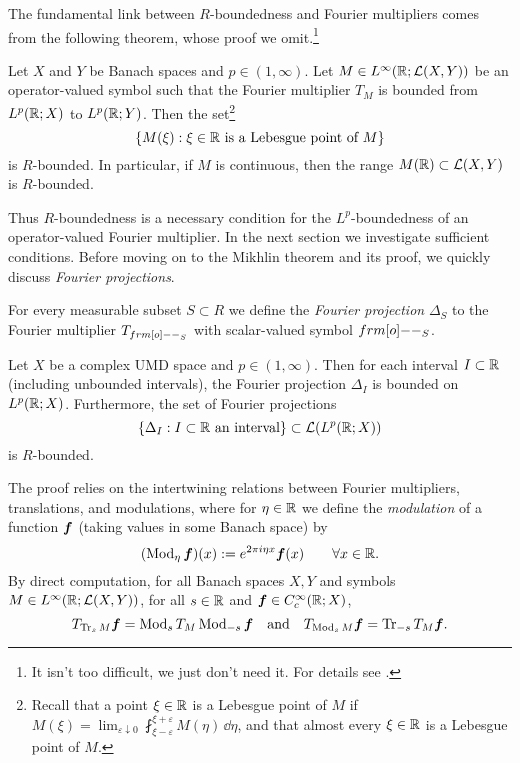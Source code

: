 The fundamental link between $R$-boundedness and Fourier multipliers comes from the following theorem, whose proof we omit.\footnote{It isn't too difficult, we just don't need it. For details see \cite[Theorem 5.3.15]{HNVW16}.}

\begin{thm}
  Let $X$ and $Y$ be Banach spaces and $p \in (1,\infty)$.
  Let $M \in L^\infty(\mathbb{R};\mathcal{L}(X,Y))$ be an operator-valued symbol such that the Fourier multiplier $T_{M}$ is bounded from $L^p(\mathbb{R};X)$ to $L^p(\mathbb{R};Y)$.
  Then the set\footnote{Recall that a point $\xi \in \mathbb{R}$ is a Lebesgue point of $M$ if $M(\xi) = \lim_{\varepsilon \downarrow 0} \fint_{\xi-\varepsilon}^{\xi+\varepsilon} M(\eta) \, \dd\eta $, and that almost every $\xi \in \mathbb{R}$ is a Lebesgue point of $M$.}
  \begin{equation*}
    \{M(\xi) : \text{$\xi \in \mathbb{R}$ is a Lebesgue point of $M$}\}
  \end{equation*}
  is $R$-bounded.
  In particular, if $M$ is continuous, then the range $M(\mathbb{R}) \subset \mathcal{L}(X,Y)$ is $R$-bounded.
\end{thm}

Thus $R$-boundedness is a necessary condition for the $L^p$-boundedness of an operator-valued Fourier multiplier.
In the next section we investigate sufficient conditions.
Before moving on to the Mikhlin theorem and its proof, we quickly discuss \emph{Fourier projections}.

\begin{defn}
  For every measurable subset $S \subset R$ we define the \emph{Fourier projection} $\Delta_{S}$ to the Fourier multiplier $T_{\1_{S}}$ with scalar-valued symbol $\1_{S}$.
\end{defn}

\begin{prop}\label{prop:Fproj-Rbd}
  Let $X$ be a complex UMD space and $p \in (1,\infty)$.
  Then for each interval $I \subset \mathbb{R}$ (including unbounded intervals), the Fourier projection $\Delta_{I}$ is bounded on $L^p(\mathbb{R};X)$.
  Furthermore, the set of Fourier projections
  \begin{equation*}
    \{\Delta_{I} : \text{$I \subset \mathbb{R}$ an interval} \} \subset \mathcal{L}(L^p(\mathbb{R};X))
  \end{equation*}
  is $R$-bounded.
\end{prop}

The proof relies on the intertwining relations between Fourier multipliers, translations, and modulations, where for $\eta \in \mathbb{R}$ we define the \emph{modulation} of a function $\bm{f}$ (taking values in some Banach space) by
\begin{equation*}
  (\operatorname{Mod}_{\eta} \bm{f})(x) := e^{2\pi i \eta x} \bm{f}(x) \qquad \forall x \in \mathbb{R}.
\end{equation*}
By direct computation, for all Banach spaces $X,Y$ and symbols $M \in L^\infty(\mathbb{R};\mathcal{L}(X,Y))$, for all $s \in \mathbb{R}$ and $\bm{f} \in C^{\infty}_{c}(\mathbb{R};X)$,
\begin{equation*}
  T_{\operatorname{Tr}_{s} M} \bm{f} = \operatorname{Mod}_{s} T_{M} \operatorname{Mod}_{-s} \bm{f} \quad \text{and} \quad
  T_{\operatorname{Mod}_{s} M} \bm{f} = \operatorname{Tr}_{-s} T_{M} \bm{f}. 
\end{equation*}


